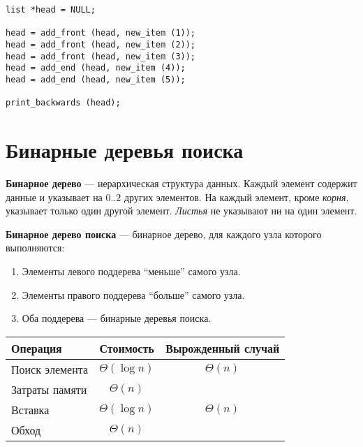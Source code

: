 \lstset{label=lst:list-usage,caption=Пример использования}
\begin{lstlisting}
list *head = NULL;

head = add_front (head, new_item (1));
head = add_front (head, new_item (2));
head = add_front (head, new_item (3));
head = add_end (head, new_item (4));
head = add_end (head, new_item (5));

print_backwards (head);
\end{lstlisting}

\section{Бинарные деревья поиска}
\label{sec:trees}

\textbf{Бинарное дерево} --- иерархическая структура данных. Каждый элемент содержит данные и указывает на $0..2$ других элементов. На каждый элемент, кроме \emph{корня}, указывает только один другой элемент. \emph{Листья} не указывают ни на один элемент.

\textbf{Бинарное дерево поиска} --- бинарное дерево, для каждого узла которого выполняются:
\begin{enumerate}
  \item Элементы левого поддерева ``меньше'' самого узла.
  \item Элементы правого поддерева ``больше'' самого узла.
  \item Оба поддерева --- бинарные деревья поиска.
\end{enumerate}

\begin{center}
  \begin{tabular}{lcc}
    \toprule
    Операция & Стоимость & Вырожденный случай \\
    \midrule
    Поиск элемента & $\Theta(\log n)$ & $\Theta(n)$ \\
    Затраты памяти & $\Theta(n)$ & \\
    Вставка & $\Theta(\log n)$ & $\Theta(n)$ \\
    Обход & $\Theta(n)$ & \\
    \bottomrule
  \end{tabular}
\end{center}

